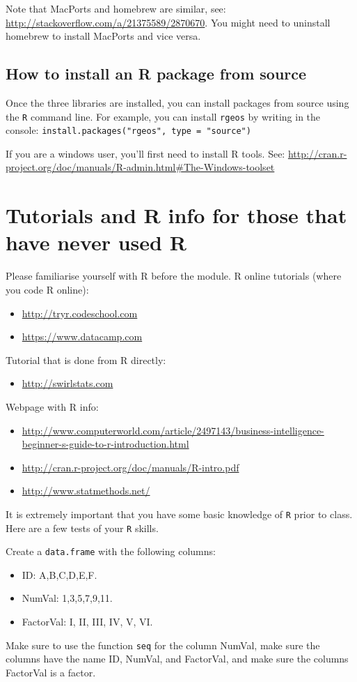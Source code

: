 \documentclass[11pt, oneside]{article}   	%
\begin{document}
Note that MacPorts and homebrew are similar, see: \url{http://stackoverflow.com/a/21375589/2870670}. You might need to uninstall homebrew to install MacPorts and vice versa.

\subsection{How to install an R package from source}
Once the three libraries are installed, you can install packages from source using the \texttt{R} command line. For example, you can install \texttt{rgeos} by writing in the console: \texttt{install.packages("rgeos", type = "source")}

If you are a windows user, you'll first need to install R tools. See: \url{http://cran.r-project.org/doc/manuals/R-admin.html#The-Windows-toolset}

\section{Tutorials and R info for those that have never used R}
Please familiarise yourself with R before the module.
R online tutorials (where you code R online):
\begin{itemize}
	\item \url{http://tryr.codeschool.com}
	\item \url{https://www.datacamp.com}
\end{itemize}
	
Tutorial that is done from R directly: 
\begin{itemize}
	\item \url{http://swirlstats.com}
\end{itemize}
	
Webpage with R info:
\begin{itemize}
	\item \url{http://www.computerworld.com/article/2497143/business-intelligence-beginner-s-guide-to-r-introduction.html}
	\item \url{http://cran.r-project.org/doc/manuals/R-intro.pdf}
	\item \url{http://www.statmethods.net/}
\end{itemize}

\begin{Exercise}

It is extremely important that you have some basic knowledge of \texttt{R} prior to class. Here are a few tests of your \texttt{R} skills.

\Question Create a \texttt{data.frame} with the following columns: 
\begin{itemize}
	\item ID: A,B,C,D,E,F.
	\item NumVal: 1,3,5,7,9,11.
	\item FactorVal: I, II, III, IV, V, VI. 
\end{itemize}
Make sure to use the function \texttt{seq} for the column NumVal, make sure the columns have the name ID, NumVal, and FactorVal, and make sure the columns FactorVal is a factor.

\end{Exercise}
\end{document}
